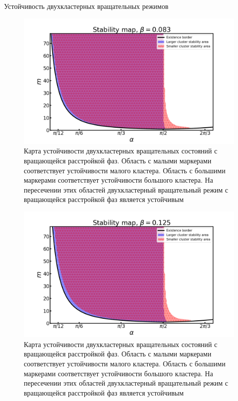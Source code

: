 \begin{chapter}{Устойчивость двухкластерных вращательных режимов}
	\begin{figure}[h!]\center
		
		\includegraphics[width=1\columnwidth]{pictures/Figure_083.png}
		\caption{Карта устойчивости двухкластерных вращательных состояний с вращающейся расстройкой фаз.
		Область с малыми маркерами соответствует устойчивости малого кластера.
		Область с большими маркерами соответствует устойчивости большого кластера.
		На пересечении этих областей двухкластерный вращательный режим с вращающейся расстройкой фаз является устойчивым}
		\label{map-083}
	\end{figure}


	\begin{figure}[h!]\center
		\includegraphics[width=1\columnwidth]{pictures/Figure_125.png}
		\caption{Карта устойчивости двухкластерных вращательных состояний с вращающейся расстройкой фаз.
		Область с малыми маркерами соответствует устойчивости малого кластера.
		Область с большими маркерами соответствует устойчивости большого кластера.
		На пересечении этих областей двухкластерный вращательный режим с вращающейся расстройкой фаз является устойчивым}
		\label{map-0125}
	\end{figure}


\end{chapter}
